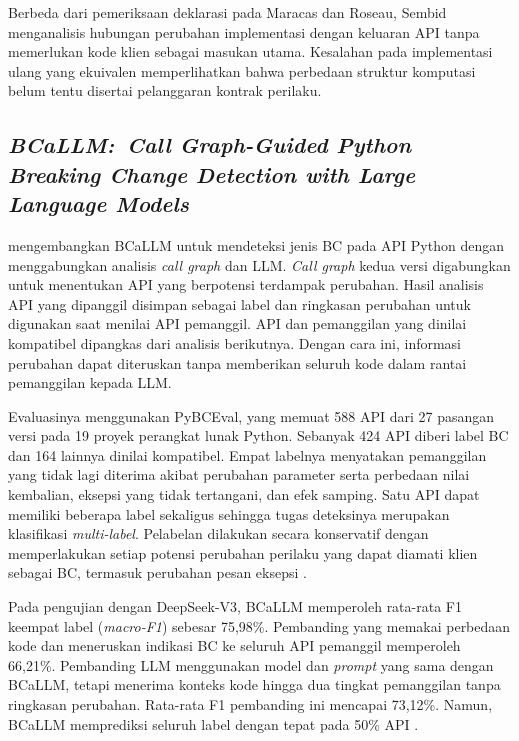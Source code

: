 Berbeda dari pemeriksaan deklarasi pada Maracas dan Roseau, Sembid menganalisis hubungan perubahan implementasi dengan keluaran API tanpa memerlukan kode klien sebagai masukan utama. Kesalahan pada implementasi ulang yang ekuivalen memperlihatkan bahwa perbedaan struktur komputasi belum tentu disertai pelanggaran kontrak perilaku.

\subsection{\textit{BCaLLM:\ Call Graph-Guided Python Breaking Change Detection with Large Language Models}}
\label{subsec:bcallm}

\textcite{Cheng2026BCaLLM} mengembangkan BCaLLM untuk mendeteksi jenis BC pada API Python dengan menggabungkan analisis \textit{call graph} dan LLM\@. \textit{Call graph} kedua versi digabungkan untuk menentukan API yang berpotensi terdampak perubahan. Hasil analisis API yang dipanggil disimpan sebagai label dan ringkasan perubahan untuk digunakan saat menilai API pemanggil. API dan pemanggilan yang dinilai kompatibel dipangkas dari analisis berikutnya. Dengan cara ini, informasi perubahan dapat diteruskan tanpa memberikan seluruh kode dalam rantai pemanggilan kepada LLM\@.

\begin{samepage}
Evaluasinya menggunakan PyBCEval, yang memuat 588 API dari 27 pasangan versi pada 19 proyek perangkat lunak Python. Sebanyak 424 API diberi label BC dan 164 lainnya dinilai kompatibel. Empat labelnya menyatakan pemanggilan yang tidak lagi diterima akibat perubahan parameter serta perbedaan nilai kembalian, eksepsi yang tidak tertangani, dan efek samping. Satu API dapat memiliki beberapa label sekaligus sehingga tugas deteksinya merupakan klasifikasi \textit{multi-label}. Pelabelan dilakukan secara konservatif dengan memperlakukan setiap potensi perubahan perilaku yang dapat diamati klien sebagai BC, termasuk perubahan pesan eksepsi \parencite[Bagian~3 dan~5]{Cheng2026BCaLLM}.

\end{samepage}

Pada pengujian dengan DeepSeek-V3, BCaLLM memperoleh rata-rata F1 keempat label (\textit{macro-F1}) sebesar 75,98\%. Pembanding yang memakai perbedaan kode dan meneruskan indikasi BC ke seluruh API pemanggil memperoleh 66,21\%. Pembanding LLM menggunakan model dan \textit{prompt} yang sama dengan BCaLLM, tetapi menerima konteks kode hingga dua tingkat pemanggilan tanpa ringkasan perubahan. Rata-rata F1 pembanding ini mencapai 73,12\%. Namun, BCaLLM memprediksi seluruh label dengan tepat pada 50\% API \parencite[Tabel~2]{Cheng2026BCaLLM}.


